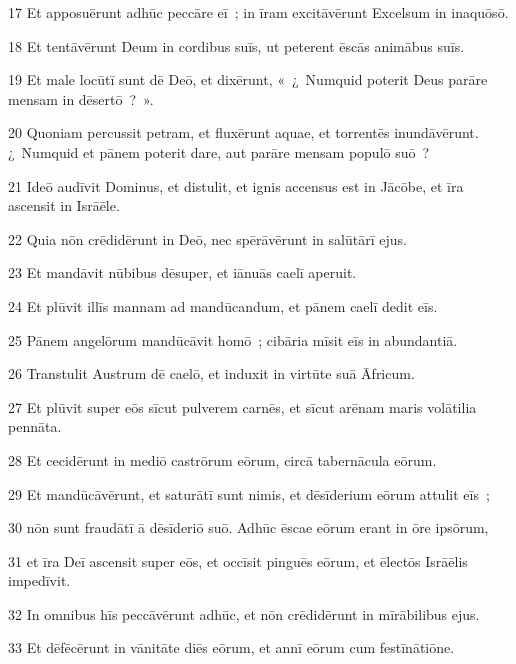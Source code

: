 \psalmVerse
  {\phantom{0}17}
  {Et apposuērunt adhūc peccāre eī~; in īram excitāvērunt Excelsum in inaquōsō.}


\psalmVerse
  {\phantom{0}18}
  {Et tentāvērunt Deum in cordibus suīs, ut peterent ēscās animābus suīs.}


\psalmVerse
  {\phantom{0}19}
  {Et male locūtī sunt dē Deō, et dixērunt, «~¿~Numquid poterit Deus parāre mensam in dēsertō~?~».}


\psalmVerse
  {\phantom{0}20}
  {Quoniam percussit petram, et fluxērunt aquae, et torrentēs inundāvērunt. ¿~Numquid et pānem poterit dare, aut parāre mensam populō suō~?}


\psalmVerse
  {\phantom{0}21}
  {Ideō audīvit Dominus, et distulit, et ignis accensus est in Jācōbe, et īra ascensit in Isrāēle.}


\psalmVerse
  {\phantom{0}22}
  {Quia nōn crēdidērunt in Deō, nec spērāvērunt in salūtārī ejus.}


\psalmVerse
  {\phantom{0}23}
  {Et mandāvit nūbibus dēsuper, et iānuās caelī aperuit.}


\psalmVerse
  {\phantom{0}24}
  {Et plūvit illīs mannam ad mandūcandum, et pānem caelī dedit eīs.}


\psalmVerse
  {\phantom{0}25}
  {Pānem angelōrum mandūcāvit homō~; cibāria mīsit eīs in abundantiā.}


\psalmVerse
  {\phantom{0}26}
  {Transtulit Austrum dē caelō, et induxit in virtūte suā Āfricum.}


\psalmVerse
  {\phantom{0}27}
  {Et plūvit super eōs sīcut pulverem carnēs, et sīcut arēnam maris volātilia pennāta.}


\psalmVerse
  {\phantom{0}28}
  {Et cecidērunt in mediō castrōrum eōrum, circā tabernācula eōrum.}


\psalmVerse
  {\phantom{0}29}
  {Et mandūcāvērunt, et saturātī sunt nimis, et dēsīderium eōrum attulit eīs~;}


\psalmVerse
  {\phantom{0}30}
  {nōn sunt fraudātī ā dēsīderiō suō. Adhūc ēscae eōrum erant in ōre ipsōrum,}


\psalmVerse
  {\phantom{0}31}
  {et īra Deī ascensit super eōs, et occīsit pinguēs eōrum, et ēlectōs Isrāēlis impedīvit.}


\psalmVerse
  {\phantom{0}32}
  {In omnibus hīs peccāvērunt adhūc, et nōn crēdidērunt in mīrābilibus ejus.}


\psalmVerse
  {\phantom{0}33}
  {Et dēfēcērunt in vānitāte diēs eōrum, et annī eōrum cum festīnātiōne.}


